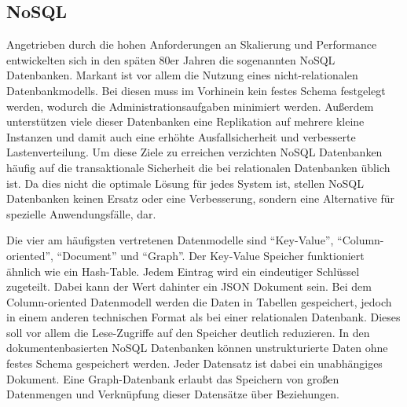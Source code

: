 \subsection{NoSQL}


Angetrieben durch die hohen Anforderungen an Skalierung und Performance entwickelten sich in den späten 80er Jahren die sogenannten NoSQL Datenbanken. Markant ist vor allem die Nutzung eines nicht-relationalen Datenbankmodells. Bei diesen muss im Vorhinein kein festes Schema festgelegt werden, wodurch die Administrationsaufgaben minimiert werden. Außerdem unterstützen viele dieser Datenbanken eine Replikation auf mehrere kleine Instanzen und damit auch eine erhöhte Ausfallsicherheit und verbesserte Lastenverteilung. Um diese Ziele zu erreichen verzichten NoSQL Datenbanken häufig auf die transaktionale Sicherheit die bei relationalen Datenbanken üblich ist. Da dies nicht die optimale Lösung für jedes System ist, stellen NoSQL Datenbanken keinen Ersatz oder eine Verbesserung, sondern eine Alternative für spezielle Anwendungsfälle, dar.

Die vier am häufigsten vertretenen Datenmodelle sind \enquote{Key-Value}, \enquote{Column-oriented}, \enquote{Document} und \enquote{Graph}. Der Key-Value Speicher funktioniert ähnlich wie ein Hash-Table. Jedem Eintrag wird ein eindeutiger Schlüssel zugeteilt. Dabei kann der Wert dahinter ein \gls{JSON} Dokument sein. Bei dem Column-oriented Datenmodell werden die Daten in Tabellen gespeichert, jedoch in einem anderen technischen Format als bei einer relationalen Datenbank. Dieses soll vor allem die Lese-Zugriffe auf den Speicher deutlich reduzieren. In den dokumentenbasierten NoSQL Datenbanken können unstrukturierte Daten ohne festes Schema gespeichert werden. Jeder Datensatz ist dabei ein unabhängiges Dokument. Eine Graph-Datenbank erlaubt das Speichern von großen Datenmengen und Verknüpfung dieser Datensätze über Beziehungen.


